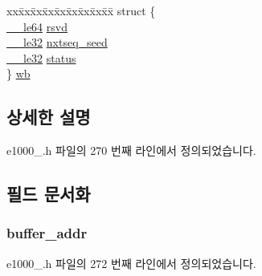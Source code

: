 \begin{DoxyCompactItemize}
\begin{tabbing}
\end{tabbing}\item 
\begin{tabbing}
xx\=xx\=xx\=xx\=xx\=xx\=xx\=xx\=xx\=\kill
struct \{\\
\>\hyperlink{lib_2igb_2e1000__osdep_8h_a082a2c540152aca8c135a709aa7d228f}{\_\_le64} \hyperlink{unione1000__adv__tx__desc_afe5f3d676089fc80bb6e99fd5d5e067e}{rsvd}\\
\>\hyperlink{lib_2igb_2e1000__osdep_8h_a4eb26b9fcde1be4ec7556787e0d3281b}{\_\_le32} \hyperlink{unione1000__adv__tx__desc_a51070cf827424742e118e1c6e9bcf46d}{nxtseq\_seed}\\
\>\hyperlink{lib_2igb_2e1000__osdep_8h_a4eb26b9fcde1be4ec7556787e0d3281b}{\_\_le32} \hyperlink{unione1000__adv__tx__desc_acb1e7555dd5af8139307a5411606d576}{status}\\
\} \hyperlink{unione1000__adv__tx__desc_a8681d58b3313b5727b804f3e98bc90d3}{wb}\\

\end{tabbing}\end{DoxyCompactItemize}


\subsection{상세한 설명}


e1000\+\_.\+h 파일의 270 번째 라인에서 정의되었습니다.



\subsection{필드 문서화}
\subsubsection[{\texorpdfstring{buffer\+\_\+addr}{buffer_addr}}]{ buffer\+\_\+addr}\hypertarget{unione1000__adv__tx__desc_a87d79130b57fb21eedf04b9d3945c3d6}{}\label{unione1000__adv__tx__desc_a87d79130b57fb21eedf04b9d3945c3d6}


e1000\+\_.\+h 파일의 272 번째 라인에서 정의되었습니다.

